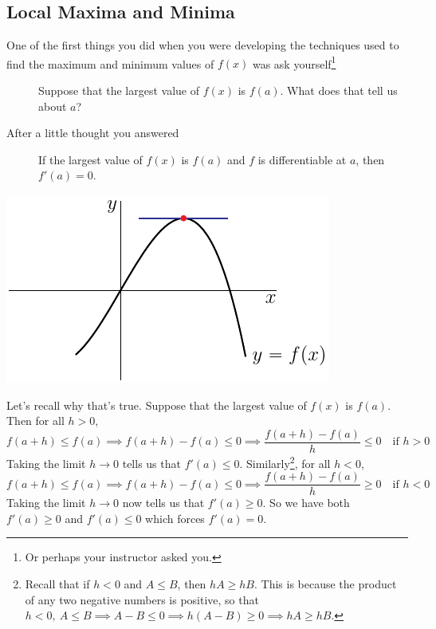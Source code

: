 \subsection*{Local Maxima and Minima}
One of the first things you did when you were developing the techniques
used to find the maximum and minimum values of $f(x)$ was ask
yourself\footnote{Or perhaps your instructor asked you.}
\begin{description}
\item[\hskip0.25in] 
Suppose that the largest value of $f(x)$ is $f(a)$. 
What does that tell us about $a$?
\end{description}
After a little thought you answered
\begin{description}
\item[\hskip0.25in] 
If the largest value of $f(x)$ is $f(a)$
and $f$ is differentiable at $a$, then $f'(a)=0$.
\end{description}
\begin{nfig}
\begin{center}
   \includegraphics{localMaxA.pdf}
\end{center}
\end{nfig}
Let's recall why that's true. Suppose that the largest value of $f(x)$
is $f(a)$. Then for all $h>0$,
\begin{equation*}
f(a+h)\le f(a)
\implies f(a+h)-f(a)\le 0
\implies \frac{f(a+h)-f(a)}{h}\le 0\quad\text{if $h>0$}
\end{equation*}
Taking the limit $h\rightarrow 0$ tells us that $f'(a)\le 0$.
Similarly\footnote{Recall that if $h<0$ and $A\le B$, then $hA\ge hB$. This is because the product of any two negative numbers is positive, so that
$h<0,\ A\le B
  \implies A-B\le 0
  \implies h(A-B)\ge 0
  \implies hA\ge hB$.},  for all $h<0$,
\begin{equation*}
f(a+h)\le f(a)
\implies f(a+h)-f(a)\le 0
\implies \frac{f(a+h)-f(a)}{h}\ge 0\quad\text{if $h<0$}
\end{equation*}
Taking the limit $h\rightarrow 0$ now tells us that $f'(a)\ge 0$.
So we have both $f'(a)\ge 0$ and $f'(a)\le 0$ which forces $f'(a)=0$.

